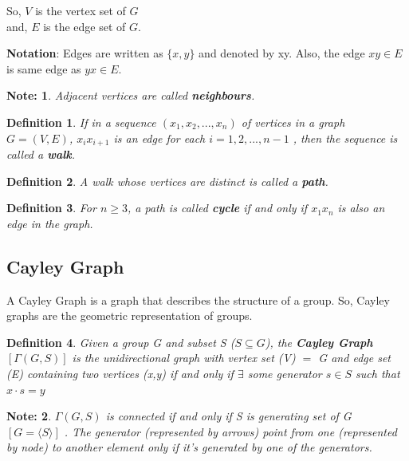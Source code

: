 \documentclass[12pt,a4paper]{article}
\theoremstyle{custom}
\newtheorem*{definition}{Definition}
\newtheorem*{note}{Note:}
\begin{document}
So,  $V$ is the vertex set of $G$\\
and, $E$ is the edge set of $G$. 

\textbf{Notation}: Edges are written as $\{x, y\}$ and denoted by xy. Also, the edge $xy \in E$ is same edge as $yx \in E$. 
\begin{note} Adjacent vertices are called \textbf{neighbours}.   \end{note}
\begin{definition}
    If in a sequence $\left(x_1, x_2, ..., x_n\right)$ of vertices in a graph $G = (V, E)$, $x_i x_{i+1}$ is an edge for each $i=1,2, ..., n-1$ , then the sequence is called a \textbf{walk}. 
\end{definition}

\begin{definition}
    A walk whose vertices are distinct is called a \textbf{path}.
\end{definition}

\begin{definition}
    For $n \geq 3$, a path is called \textbf{cycle} if and only if $x_1x_n$ is also an edge in the graph. 
\end{definition}


\subsection*{Cayley Graph}

A Cayley Graph \cite{bartlett2014cayley,article} is a graph that describes the structure of a group. So, Cayley graphs are the geometric representation of groups. 

\begin{definition}
    Given a group  G and subset S ($S\subseteq G$), the \textbf{Cayley Graph} $[\Gamma(G,S)]$ is the unidirectional graph with vertex set (V) $=$ G and edge set (E) containing two vertices (x,y) if and only if $\exists$ some generator $s \in S$ such that $\boxed{x\cdot s=y}$
\end{definition}

\begin{note}
    $\Gamma(G,S)$ is connected if and only if S is generating set of G $[G = \langle S \rangle]$
. The generator (represented by arrows) point from one (represented by node) to another element only if it's generated by one of the generators. 
\end{note}
\end{document}
